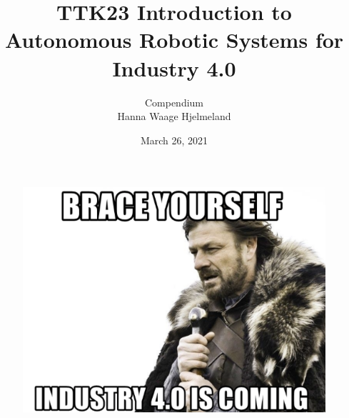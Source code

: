 \documentclass[11pt, a4paper, USenglish]{article} %
\begin{document}
\title{TTK23 Introduction to Autonomous Robotic Systems for Industry 4.0}
\author{Compendium\\
Hanna Waage Hjelmeland}
\date{March 26, 2021}
\begin{titlepage}
    \maketitle
    \begin{figure}[h]
    \centering
        \includegraphics[width=\textwidth]{figures/FaultBasics/robot.png}\\   
    \end{figure}

   \thispagestyle{empty}
\end{titlepage}

%
\newpage
\newpage
\tableofcontents
{}
\thispagestyle{empty}

\newpage
\setcounter{page}{1}








\newpage
\printbibliography
\label{sec:bibliography}
\end{document}
